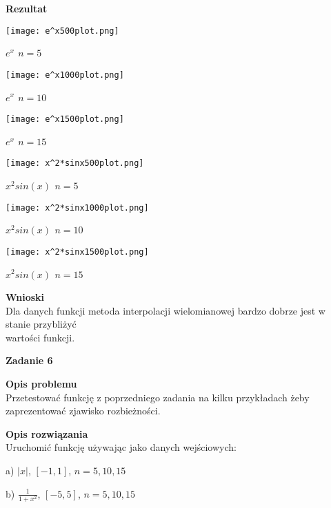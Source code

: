 \documentclass{article}
\begin{document}
\pagebreak

\noindent \textbf{Rezultat}

\begin{center}
	\texttt{[image: e^x500plot.png]}

	\textbf{$e^x$ $n=5$}
\end{center}

\begin{center}
	\texttt{[image: e^x1000plot.png]}

	\textbf{$e^x$ $n=10$}
\end{center}

\begin{center}
	\texttt{[image: e^x1500plot.png]}

	\textbf{$e^x$ $n=15$}
\end{center}

\begin{center}
	\texttt{[image: x^2*sinx500plot.png]}

	\textbf{$x^2sin(x)$ $n=5$}
\end{center}

\begin{center}
	\texttt{[image: x^2*sinx1000plot.png]}

	\textbf{$x^2sin(x)$ $n=10$}
\end{center}

\begin{center}
	\texttt{[image: x^2*sinx1500plot.png]}

	\textbf{$x^2sin(x)$ $n=15$}
\end{center}

\pagebreak

\noindent \textbf{Wnioski} \\
Dla danych funkcji metoda interpolacji wielomianowej
bardzo dobrze jest w stanie przybliżyć \\ wartości funkcji.

\noindent \textbf{\large Zadanie 6}

\noindent \textbf{Opis problemu} \\
Przetestować funkcję z poprzedniego zadania na kilku przykładach żeby
zaprezentować zjawisko rozbieżności.

\noindent \textbf{Opis rozwiązania} \\
Uruchomić funkcję używając jako danych wejściowych:

a) $|x|$, $[-1,1]$, $n=5,10,15$

b) $\frac{1}{1+x^2}$, $[-5,5]$, $n=5,10,15$
\end{document}
